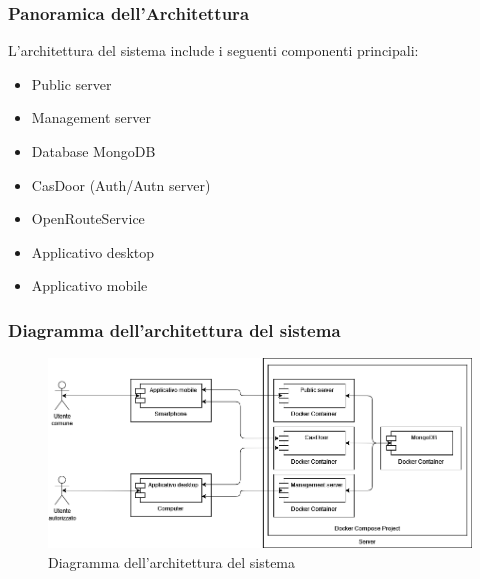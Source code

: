 \documentclass{article}
\begin{document}
\subsubsection{Panoramica dell'Architettura}
L'architettura del sistema include i seguenti componenti principali:
\begin{itemize}
    \item Public server
    \item Management server
    \item Database MongoDB
    \item CasDoor (Auth/Autn server)
    \item OpenRouteService
    \item Applicativo desktop
    \item Applicativo mobile
\end{itemize}

\subsubsection{Diagramma dell'architettura del sistema}

\begin{figure}[h]
    \centering
    \includegraphics[width=1\textwidth]{Images/Component.png}
    \caption{Diagramma dell'architettura del sistema}
    \label{fig:architettura}
\end{figure}
\end{document}
